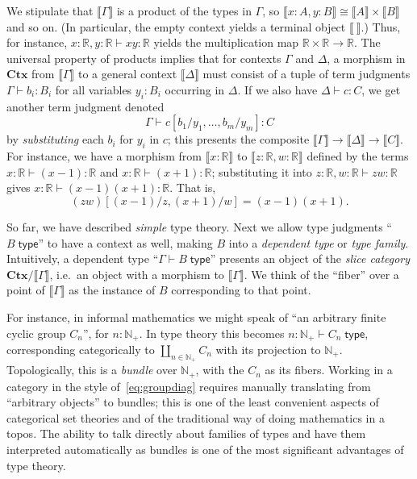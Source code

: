 \documentclass[10pt]{article}
\def\ty{\;\mathsf{type}}
\def\m#1{\llbracket#1\rrbracket}
\def\R{\mathbb{R}}
\def\Np{\mathbb{N}_+}
\def\types{\vdash}
\def\Ctx{\mathbf{Ctx}}
\numberwithin{equation}{section}
\begin{document}
We stipulate that $\m\Gamma$ is a product of the types in $\Gamma$, so $\m{x:A,y:B}\cong \m{A}\times \m B$ and so on.
(In particular, the empty context yields a terminal object $\m{~}$.)
Thus, for instance, $x:\R, y:\R \types x y:\R$ yields the multiplication map $\R\times \R \to \R$.
%
The universal property of products implies that for contexts $\Gamma$ and $\Delta$, a morphism in $\Ctx$ from $\m\Gamma$ to a general context $\m\Delta$ must consist of a tuple of term judgments $\Gamma \types b_i : B_i$ for all variables $y_i:B_i$ occurring in $\Delta$.
If we also have $\Delta \types c:C$, we get another term judgment denoted
\[\Gamma \types c[b_1/y_1,\dots,b_m/y_m]:C\]
by \emph{substituting} each $b_i$ for $y_i$ in $c$; this presents the composite $\m \Gamma \to \m \Delta \to \m C$.
For instance, we have a morphism from $\m{x:\R}$ to $\m{z:\R,w:\R}$ defined by the terms $x:\R \types (x-1):\R$ and $x:\R \types (x+1):\R$; substituting it into $z:\R, w:\R \types z w:\R$ gives $x:\R \types (x-1)(x+1) : \R$.
That is,
\[(z w)[(x-1)/z,(x+1)/w] = (x-1)(x+1).\]

So far, we have described \emph{simple} type theory.
Next we allow type judgments ``$B\ty$'' to have a context as well, making $B$ into a \emph{dependent type} or \emph{type family}.
Intuitively, a dependent type ``$\Gamma \types B\ty$'' presents an object of the \emph{slice category} $\Ctx/\m\Gamma$, i.e.\ an object with a morphism to $\m\Gamma$.
We think of the ``fiber'' over a point of $\m\Gamma$ as the instance of $B$ corresponding to that point.

For instance, in informal mathematics we might speak of ``an arbitrary finite cyclic group $C_n$'', for $n: \Np$.
In type theory this becomes $n:\Np \types C_n \ty$, corresponding categorically to $\coprod_{n\in \Np} C_n$ with its projection to $\Np$.
Topologically, this is a \emph{bundle} over $\Np$, with the $C_n$ as its fibers.
Working in a category in the style of~\eqref{eq:groupdiag} requires manually translating from ``arbitrary objects'' to bundles; this is one of the least convenient aspects of categorical set theories and of the traditional way of doing mathematics in a topos.
The ability to talk directly about families of types and have them interpreted automatically as bundles is one of the most significant advantages of type theory.
\end{document}
